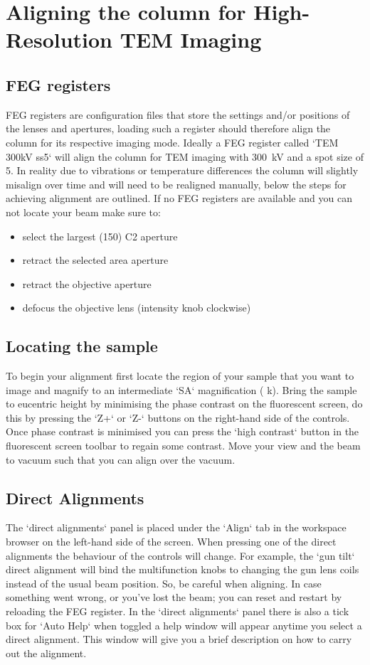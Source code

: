 \documentclass[a4paper]{scrartcl}
\begin{document}
\section*{Aligning the column for High-Resolution TEM Imaging}
\subsection*{FEG registers}
FEG registers are configuration files that store the settings and/or positions of the lenses and apertures, loading such a register should therefore align the column for its respective imaging mode. Ideally a FEG register called `TEM 300kV ss5` will align the column for TEM imaging with \SI{300}{\kilo \volt} and a spot size of 5. In reality due to vibrations or temperature differences the column will slightly misalign over time and will need to be realigned manually, below the steps for achieving alignment are outlined. If no FEG registers are available and you can not locate your beam make sure to:
\begin{itemize}
	\item select the largest (150) C2 aperture 	
	\item retract the selected area aperture
	\item retract the objective aperture
	\item defocus the objective lens (intensity knob clockwise)
\end{itemize}

\subsection*{Locating the sample}
To begin your alignment first locate the region of your sample that you want to image and magnify to an intermediate `SA` magnification ( k\times). Bring the sample to eucentric height by minimising the phase contrast on the fluorescent screen, do this by pressing the `Z+` or `Z-` buttons on the right-hand side of the controls. Once phase contrast is minimised you can press the `high contrast` button in the fluorescent screen toolbar to regain some contrast. Move your view and the beam to vacuum such that you can align over the vacuum. 

\subsection*{Direct Alignments}
The `direct alignments` panel is placed under the `Align` tab in the workspace browser on the left-hand side of the screen. When pressing one of the direct alignments the behaviour of the controls will change. For example, the `gun tilt` direct alignment will bind the multifunction knobs to changing the gun lens coils instead of the usual beam position. So, be careful when aligning. In case something went wrong, or you've lost the beam; you can reset and restart by reloading the FEG register. In the `direct alignments` panel there is also a tick box for `Auto Help` when toggled a help window will appear anytime you select a direct alignment. This window will give you a brief description on how to carry out the alignment.
\end{document}
